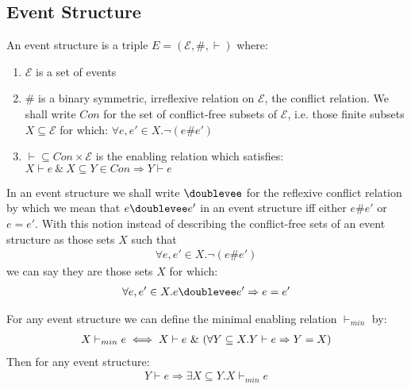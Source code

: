 \subsection{Event Structure}
\begin{definition}
    An event structure is a triple $E = (\mathcal{E},\#,\vdash)$ where:
    \begin{enumerate}
        \item $\mathcal{E}$ is a set of events
        \item \# is a binary symmetric, irreflexive relation on $\mathcal{E}$,
              the conflict relation.
              We shall write $Con$ for the set of conflict-free subsets of $\mathcal{E}$,
              i.e. those finite subsets $X \subseteq \mathcal{E}$ for which:
              $\forall e,e' \in X . \neg (e\#e')$
        \item $\vdash \subseteq Con \times \mathcal{E}$ is the enabling relation which satisfies:
              $ X \vdash e \ \& \ X \subseteq Y \in Con \Rightarrow Y \vdash e$
    \end{enumerate}

\end{definition}
\begin{notion}
    In an event structure we shall write $\doublevee$ for the reflexive conflict relation by which we mean
    that $e\doublevee e'$ in an event structure iff either $e\#e'$ or $e=e'$.
    With this notion instead of describing the conflict-free sets of an event structure
    as those sets $X$ such that
    \begin{align*}
        \forall e,e' \in X. \neg(e\#e')
    \end{align*}
    we can say they are those sets $X$ for which:
    \begin{align*}
        \forall e,e' \in X. e\doublevee e' \Rightarrow e=e'
    \end{align*}
\end{notion}

\begin{notion}
    For any event structure we can define the minimal enabling relation $\vdash_{min}$ by:
    \begin{align*}
        X \vdash_{min} e \iff X \vdash e \ \& \ 
        ( \forall Y \subseteq X . Y \vdash e \Rightarrow Y = X )
    \end{align*}
    Then for any event structure:
    \begin{align*}
        Y \vdash e \Rightarrow \exists X \subseteq Y . X \vdash_{min} e
    \end{align*}
\end{notion}

